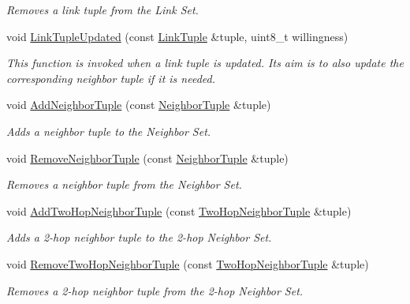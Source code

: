 \begin{DoxyCompactItemize}
\begin{DoxyCompactList}\small\item\em Removes a link tuple from the Link Set. \end{DoxyCompactList}\item 
void \hyperlink{classns3_1_1olsr_1_1RoutingProtocol_a00df90e72ca9f8de10b6f7859fb730eb}{Link\+Tuple\+Updated} (const \hyperlink{structns3_1_1olsr_1_1LinkTuple}{Link\+Tuple} \&tuple, uint8\+\_\+t willingness)
\begin{DoxyCompactList}\small\item\em This function is invoked when a link tuple is updated. Its aim is to also update the corresponding neighbor tuple if it is needed. \end{DoxyCompactList}\item 
void \hyperlink{classns3_1_1olsr_1_1RoutingProtocol_a2378ff630c93a17fd040b61e8a9c1fb4}{Add\+Neighbor\+Tuple} (const \hyperlink{structns3_1_1olsr_1_1NeighborTuple}{Neighbor\+Tuple} \&tuple)
\begin{DoxyCompactList}\small\item\em Adds a neighbor tuple to the Neighbor Set. \end{DoxyCompactList}\item 
void \hyperlink{classns3_1_1olsr_1_1RoutingProtocol_af91353f674fb4f529921fb654203ab74}{Remove\+Neighbor\+Tuple} (const \hyperlink{structns3_1_1olsr_1_1NeighborTuple}{Neighbor\+Tuple} \&tuple)
\begin{DoxyCompactList}\small\item\em Removes a neighbor tuple from the Neighbor Set. \end{DoxyCompactList}\item 
void \hyperlink{classns3_1_1olsr_1_1RoutingProtocol_a0ba9661c0d7b61bb0785f3c10af566d5}{Add\+Two\+Hop\+Neighbor\+Tuple} (const \hyperlink{structns3_1_1olsr_1_1TwoHopNeighborTuple}{Two\+Hop\+Neighbor\+Tuple} \&tuple)
\begin{DoxyCompactList}\small\item\em Adds a 2-\/hop neighbor tuple to the 2-\/hop Neighbor Set. \end{DoxyCompactList}\item 
void \hyperlink{classns3_1_1olsr_1_1RoutingProtocol_adc613a8eb47ccb94878d8e9f61e9d11a}{Remove\+Two\+Hop\+Neighbor\+Tuple} (const \hyperlink{structns3_1_1olsr_1_1TwoHopNeighborTuple}{Two\+Hop\+Neighbor\+Tuple} \&tuple)
\begin{DoxyCompactList}\small\item\em Removes a 2-\/hop neighbor tuple from the 2-\/hop Neighbor Set. \end{DoxyCompactList}\item 

\end{DoxyCompactItemize}
